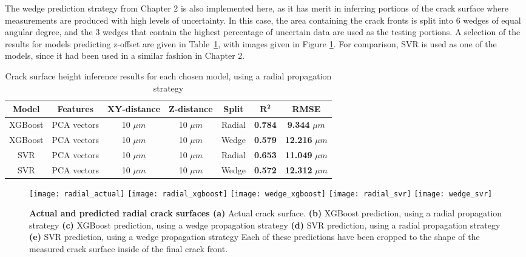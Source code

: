 The wedge prediction strategy from Chapter 2 is also implemented here, as it has merit in inferring portions of the crack surface where measurements are produced with high levels of uncertainty.  In this case, the area containing the crack fronts is split into $6$ wedges of equal angular degree, and the 3 wedges that contain the highest percentage of uncertain data are used as the testing portions.  A selection of the results for models predicting z-offset are given in Table~\ref{table:radial-comparison}, with images given in Figure \ref{fig:radial_predictions}.  For comparison, SVR is used as one of the models, since it had been used in a similar fashion in Chapter 2.

\begin{table}[b]
  \centering
  \caption{Crack surface height inference results for each chosen model, using a radial propagation strategy}
  \label{table:radial-comparison}
  \begin{tabular}{| c | c | c | c | c | c | c |} \hline
    \textbf{Model} & \textbf{Features} & \textbf{XY-distance} & \textbf{Z-distance} & \textbf{Split}  & $\bm{R^2}$     & \textbf{RMSE}           \\ \hline
    XGBoost        & PCA vectors       & 10 $\mu m$           & 10 $\mu m$          & Radial          & \textbf{0.784} & \textbf{9.344}  $\mu m$ \\ \hline
    XGBoost        & PCA vectors       & 10 $\mu m$           & 10 $\mu m$          & Wedge           & \textbf{0.579} & \textbf{12.216} $\mu m$ \\ \hline
    SVR            & PCA vectors       & 10 $\mu m$           & 10 $\mu m$          & Radial          & \textbf{0.653} & \textbf{11.049} $\mu m$ \\ \hline
    SVR            & PCA vectors       & 10 $\mu m$           & 10 $\mu m$          & Wedge           & \textbf{0.572} & \textbf{12.312} $\mu m$ \\ \hline
  \end{tabular}
\end{table}

\begin{figure}[t]
  \centering
    \texttt{[image: radial\_actual]}
    \texttt{[image: radial\_xgboost]}
    \texttt{[image: wedge\_xgboost]}
    \texttt{[image: radial\_svr]}
    \texttt{[image: wedge\_svr]}
    \caption{\textbf{Actual and predicted radial crack surfaces (a)}  Actual crack surface.
             \textbf{(b)} XGBoost prediction, using a radial propagation strategy
             \textbf{(c)} XGBoost prediction, using a wedge propagation strategy
             \textbf{(d)} SVR prediction, using a radial propagation strategy
             \textbf{(e)} SVR prediction, using a wedge propagation strategy
             Each of these predictions have been cropped to the shape of the measured crack surface inside of the final crack front. }
  \label{fig:radial_predictions}
\end{figure}

